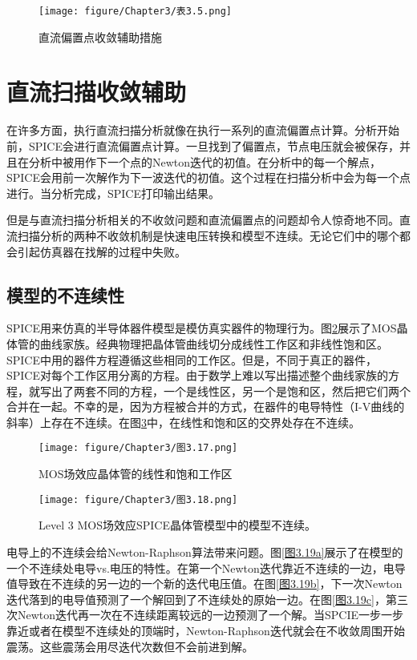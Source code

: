 \begin{figure}[htbp]
\small
    \centering
    \texttt{[image: figure/Chapter3/表3.5.png]}
    \caption{直流偏置点收敛辅助措施}
    \label{表3.5}
\end{figure}

\section{直流扫描收敛辅助}
在许多方面，执行直流扫描分析就像在执行一系列的直流偏置点计算。分析开始前，SPICE会进行直流偏置点计算。一旦找到了偏置点，节点电压就会被保存，并且在分析中被用作下一个点的Newton迭代的初值。在分析中的每一个解点，SPICE会用前一次解作为下一波迭代的初值。这个过程在扫描分析中会为每一个点进行。当分析完成，SPICE打印输出结果。

但是与直流扫描分析相关的不收敛问题和直流偏置点的问题却令人惊奇地不同。直流扫描分析的两种不收敛机制是快速电压转换和模型不连续。无论它们中的哪个都会引起仿真器在找解的过程中失败。

\subsection{模型的不连续性}
SPICE用来仿真的半导体器件模型是模仿真实器件的物理行为。图\ref{图3.17}展示了MOS晶体管的曲线家族。经典物理把晶体管曲线切分成线性工作区和非线性饱和区。SPICE中用的器件方程遵循这些相同的工作区。但是，不同于真正的器件，SPICE对每个工作区用分离的方程。由于数学上难以写出描述整个曲线家族的方程，就写出了两套不同的方程，一个是线性区，另一个是饱和区，然后把它们两个合并在一起。不幸的是，因为方程被合并的方式，在器件的电导特性（I-V曲线的斜率）上存在不连续\cite{Vlach1983}。在图\ref{图3.18}中，在线性和饱和区的交界处存在不连续。

\begin{figure}[htbp]
\small
    \centering
    \texttt{[image: figure/Chapter3/图3.17.png]}
    \caption{MOS场效应晶体管的线性和饱和工作区}
    \label{图3.17}
\end{figure}

\begin{figure}[htbp]
\small
    \centering
    \texttt{[image: figure/Chapter3/图3.18.png]}
    \caption{Level 3 MOS场效应SPICE晶体管模型中的模型不连续。}
    \label{图3.18}
\end{figure}

电导上的不连续会给Newton-Raphson算法带来问题。图\ref{图3.19a}展示了在模型的一个不连续处电导vs.电压的特性。在第一个Newton迭代靠近不连续的一边，电导值导致在不连续的另一边的一个新的迭代电压值。在图\ref{图3.19b}，下一次Newton迭代落到的电导值预测了一个解回到了不连续处的原始一边。在图\ref{图3.19c}，第三次Newton迭代再一次在不连续距离较远的一边预测了一个解。当SPCIE一步一步靠近或者在模型不连续处的顶端时，Newton-Raphson迭代就会在不收敛周围开始震荡。这些震荡会用尽迭代次数但不会前进到解。

